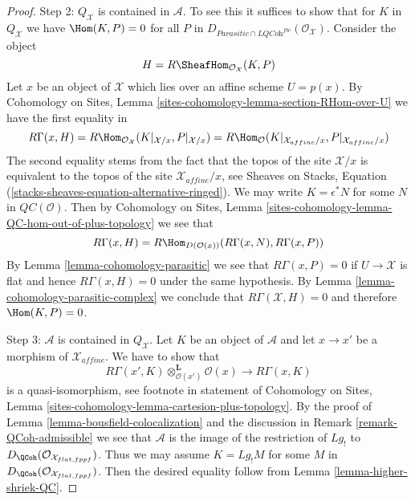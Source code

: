 \begin{proof}
\medskip\noindent
Step 2: $Q_\mathcal{X}$ is contained in $\mathcal{A}$.
To see this it suffices to show that for $K$ in $Q_\mathcal{X}$
we have $\Hom(K, P) = 0$ for all $P$ in
$D_{\textit{Parasitic} \cap \textit{LQCoh}^{fbc}}(\mathcal{O}_\mathcal{X})$.
Consider the object
$$
H = R\SheafHom_{\mathcal{O}_\mathcal{X}}(K, P)
$$
Let $x$ be an object of $\mathcal{X}$ which lies over an affine scheme
$U = p(x)$. By Cohomology on Sites, Lemma
\ref{sites-cohomology-lemma-section-RHom-over-U} we have
the first equality in
$$
R\Gamma(x, H) =
R\Hom_{\mathcal{O}_\mathcal{X}}(K|_{\mathcal{X}/x}, P|_{\mathcal{X}/x}) =
R\Hom_{\mathcal{O}}(K|_{\mathcal{X}_{affine}/x}, P|_{\mathcal{X}_{affine}/x})
$$
The second equality stems from the fact that the topos of the site
$\mathcal{X}/x$ is equivalent to the topos of the site
$\mathcal{X}_{affine}/x$, see Sheaves on Stacks, Equation
(\ref{stacks-sheaves-equation-alternative-ringed}).
We may write $K = \epsilon^*N$ for some $N$ in $\mathit{QC}(\mathcal{O})$.
Then by Cohomology on Sites, Lemma
\ref{sites-cohomology-lemma-QC-hom-out-of-plus-topology} we see
that
$$
R\Gamma(x, H) =
R\Hom_{D(\mathcal{O}(x))}(R\Gamma(x, N), R\Gamma(x, P))
$$
By Lemma \ref{lemma-cohomology-parasitic} we see that $R\Gamma(x, P) = 0$
if $U \to \mathcal{X}$ is flat and hence $R\Gamma(x, H) = 0$ under the same
hypothesis. By Lemma \ref{lemma-cohomology-parasitic-complex} we conclude that
$R\Gamma(\mathcal{X}, H) = 0$ and therefore $\Hom(K, P) = 0$.

\medskip\noindent
Step 3: $\mathcal{A}$ is contained in $Q_\mathcal{X}$.
Let $K$ be an object of $\mathcal{A}$ and let $x \to x'$
be a morphism of $\mathcal{X}_{affine}$. We have to show that
$$
R\Gamma(x', K) \otimes_{\mathcal{O}(x')}^\mathbf{L} \mathcal{O}(x)
\longrightarrow
R\Gamma(x, K)
$$
is a quasi-isomorphism, see footnote in statement of Cohomology on Sites,
Lemma \ref{sites-cohomology-lemma-cartesion-plus-topology}.
By the proof of Lemma \ref{lemma-bousfield-colocalization}
and the discussion in Remark \ref{remark-QCoh-admissible}
we see that $\mathcal{A}$ is the image of the restriction
of $Lg_!$ to $D_\QCoh(\mathcal{O}_{\mathcal{X}_{flat, fppf}})$.
Thus we may assume $K = Lg_!M$ for some $M$ in
$D_\QCoh(\mathcal{O}_{\mathcal{X}_{flat, fppf}})$.
Then the desired equality follow from Lemma \ref{lemma-higher-shriek-QC}.
\end{proof}
























